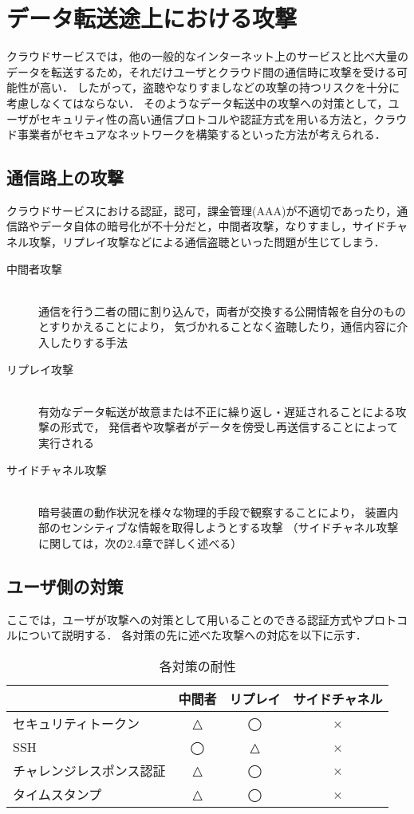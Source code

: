 \section{データ転送途上における攻撃}
クラウドサービスでは，他の一般的なインターネット上のサービスと比べ大量のデータを転送するため，それだけユーザとクラウド間の通信時に攻撃を受ける可能性が高い．
したがって，盗聴やなりすましなどの攻撃の持つリスクを十分に考慮しなくてはならない．
そのようなデータ転送中の攻撃への対策として，ユーザがセキュリティ性の高い通信プロトコルや認証方式を用いる方法と，クラウド事業者がセキュアなネットワークを構築するといった方法が考えられる．

\subsection{通信路上の攻撃}
クラウドサービスにおける認証，認可，課金管理(AAA)が不適切であったり，通信路やデータ自体の暗号化が不十分だと，中間者攻撃，なりすまし，サイドチャネル攻撃，リプレイ攻撃などによる通信盗聴といった問題が生じてしまう．

\begin{description}
	\item[中間者攻撃]\mbox{}\\ 
		通信を行う二者の間に割り込んで，両者が交換する公開情報を自分のものとすりかえることにより，
		気づかれることなく盗聴したり，通信内容に介入したりする手法	
	
	\item[リプレイ攻撃]\mbox{}\\
		有効なデータ転送が故意または不正に繰り返し・遅延されることによる攻撃の形式で，
		発信者や攻撃者がデータを傍受し再送信することによって実行される

	\item[サイドチャネル攻撃]\mbox{}\\
		暗号装置の動作状況を様々な物理的手段で観察することにより，
		装置内部のセンシティブな情報を取得しようとする攻撃
		（サイドチャネル攻撃に関しては，次の2.4章で詳しく述べる）
\end{description}

\subsection{ユーザ側の対策}
ここでは，ユーザが攻撃への対策として用いることのできる認証方式やプロトコルについて説明する．
各対策の先に述べた攻撃への対応を以下に示す．

\begin{table}[t]
\caption{各対策の耐性}
\label{tb:netmodel}
\begin{center}
\begin{tabular}{|l|c|c|c|}
\hline
　& 中間者 & リプレイ & サイドチャネル \\ \hline
セキュリティトークン & △ & ◯ & × \\ \hline
SSH & ◯ & △ & × \\ \hline
チャレンジレスポンス認証 & △ & ◯ & × \\ \hline
タイムスタンプ & △ & ◯ & × \\
\hline
\end{tabular}
\end{center}
\end{table}


